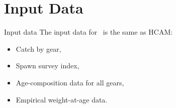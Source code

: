 \section{Input Data} %
\label{sec:inputdata}

%
\begin{frame}
	{Input data} The input data for \iscam\ is the same as HCAM: 
	\begin{itemize}
		\item Catch by gear, 
		\item Spawn survey index, 
		\item Age-composition data for all gears, 
		\item Empirical weight-at-age data. 
	\end{itemize}
\end{frame}





